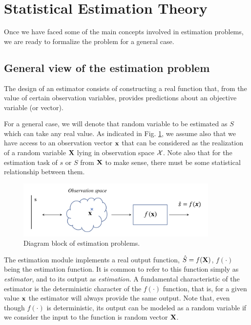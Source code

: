 \section{Statistical Estimation Theory}
\label{sec:SDT}

Once we have faced some of the main concepts involved in estimation problems, we are ready to formalize the problem for a general case.

\subsection{General view of the estimation problem}
\label{subsec:hypotheses_problems}

The design of an estimator consists of constructing a real function that, from the value of certain observation variables, provides predictions about an objective variable (or vector). 

For a general case, we will denote that random variable to be estimated as $S$ which can take any real value. As indicated in Fig. \ref{fig:est_overview}, we assume also that we have access to an observation vector $\bf x$ that can be considered as the realization of a random variable $\bf X$ lying in observation space $\cal X$. Note also that for the estimation task of $s$ or $S$ from $\bf X$ to make sense, there must be some statistical relationship between them.

\begin{figure}
\begin{center}
\includegraphics[width=10cm]{Figures//estimation_overview.png}
\end{center}
\caption{Diagram block of estimation problems.\label{fig:est_overview}}
\end{figure}


The estimation module implements a real output function, $\hat{S} = f({\bf X})$, $f(\cdot)$ being the estimation function. It is common to refer to this function simply as {\em estimator}, and to its output as {\em estimation}. A fundamental characteristic of the estimator is the deterministic character of the $f(\cdot)$ function, that is, for a given value $\bf x$ the estimator will always provide the same output. Note that, even though $f(\cdot)$ is deterministic, its output can be modeled as a random variable if we consider the input to the function is random vector $\bf X$.

